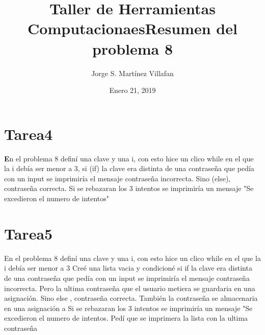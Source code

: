 \documentclass[letterpaper, 12pt, oneside]{article}%
\title{\Huge Taller de Herramientas Computacionaes}
\author{Jorge S. Martínez Villafan}
\date{Enero 21, 2019}
\begin{document}
\maketitle
\newpage
\title{Resumen del problema 8}
\section{Tarea4}
\textbf En el problema 8 definí una clave y una i, con esto hice un clico while en el que la i debía ser menor a 3, si (if) la clave era distinta de una contraseña que pedía con un input se imprimiría el mensaje contraseña incorrecta. Sino (else), contraseña correcta.
Si se rebazaran los 3 intentos se imprimiría un mensaje "Se excedieron el numero de intentos"

\section{Tarea5}
En el problema 8 definí una clave y una i, con esto hice un clico \color{blue} while \color{black} en el que la i debía ser menor a 3 Creé una lista vacia y condicioné si \color{blue} if \color{black} la clave era distinta de una contraseña que pedía con un input se imprimiría el mensaje contraseña incorrecta. Pero la ultima contraseña que el usuario metiera se guardaria en una asignación. Sino \color{blue} else \color{black}, contraseña correcta. También la contraseña se almacenaria en una asignación \color{red} a \color{black}
Si se rebazaran los 3 intentos se imprimiría un mensaje "Se excedieron el numero de intentos. Pedí que se imprimera la lista con la ultima contraseña
\end{document}
